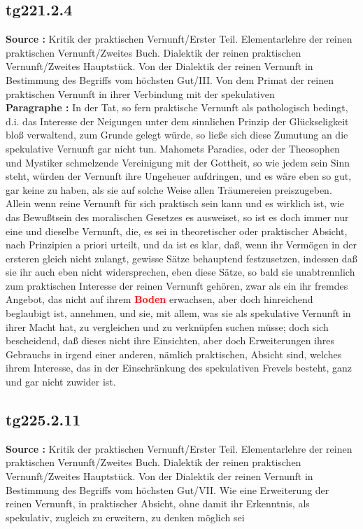\documentclass[a4paper,12pt,twoside]{book}
\newcommand{\match}[1]{\textcolor{red}{\textbf{#1}}}
\begin{document}
	\subsection*{tg221.2.4} 
	\textbf{Source : }Kritik der praktischen Vernunft/Erster Teil. Elementarlehre der reinen praktischen Vernunft/Zweites Buch. Dialektik der reinen praktischen Vernunft/Zweites Hauptstück. Von der Dialektik der reinen Vernunft in Bestimmung des Begriffs vom höchsten Gut/III. Von dem Primat der reinen praktischen Vernunft in ihrer Verbindung mit der spekulativen\\  
	
	\noindent\textbf{Paragraphe : }
	In der Tat, so fern praktische Vernunft als pathologisch bedingt, d.i. das Interesse der Neigungen unter dem sinnlichen Prinzip der Glückseligkeit bloß verwaltend, zum Grunde gelegt würde, so ließe sich diese Zumutung an die spekulative Vernunft gar nicht tun. Mahomets Paradies, oder der Theosophen und Mystiker schmelzende Vereinigung mit der Gottheit, so wie jedem sein Sinn steht, würden der Vernunft ihre Ungeheuer aufdringen, und es wäre eben so gut, gar keine zu haben, als sie auf solche Weise allen Träumereien preiszugeben. Allein wenn reine Vernunft für sich praktisch sein kann und es wirklich ist, wie das Bewußtsein des moralischen Gesetzes es ausweiset, so ist es doch immer nur eine und dieselbe Vernunft, die, es sei in theoretischer oder praktischer Absicht, nach Prinzipien a priori urteilt, und da ist es klar, daß, wenn ihr Vermögen in der ersteren gleich nicht zulangt, gewisse Sätze behauptend festzusetzen, indessen daß sie ihr auch eben nicht widersprechen, eben diese Sätze, so bald sie unabtrennlich zum praktischen Interesse der reinen Vernunft gehören, zwar als ein ihr fremdes Angebot, das nicht auf ihrem \match{Boden} erwachsen, aber doch hinreichend beglaubigt ist, annehmen, und sie, mit allem, was sie als spekulative Vernunft in ihrer Macht hat, zu vergleichen und zu verknüpfen suchen müsse; doch sich bescheidend, daß dieses nicht ihre Einsichten, aber doch Erweiterungen ihres Gebrauchs in irgend einer anderen, nämlich praktischen, Absicht sind, welches ihrem Interesse, das in der Einschränkung des spekulativen Frevels besteht, ganz und gar nicht zuwider ist. 
	
	\subsection*{tg225.2.11} 
	\textbf{Source : }Kritik der praktischen Vernunft/Erster Teil. Elementarlehre der reinen praktischen Vernunft/Zweites Buch. Dialektik der reinen praktischen Vernunft/Zweites Hauptstück. Von der Dialektik der reinen Vernunft in Bestimmung des Begriffs vom höchsten Gut/VII. Wie eine Erweiterung der reinen Vernunft, in praktischer Absicht, ohne damit ihr Erkenntnis, als spekulativ, zugleich zu erweitern, zu denken möglich sei\\  
	
\end{document}
